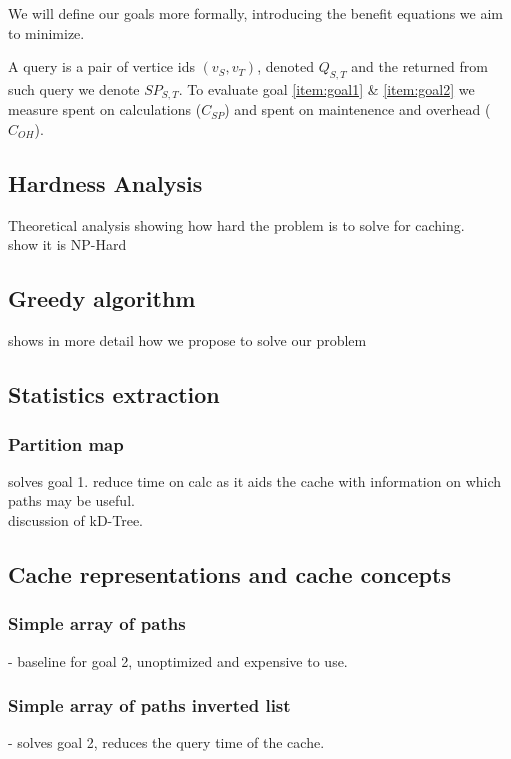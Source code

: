 We will define our goals more formally, introducing the benefit equations we aim to minimize.

A query is a pair of vertice ids $(v_S, v_T)$, denoted $Q_{S,T}$ and the \spath returned from such query we denote $SP_{S,T}$. 
To evaluate goal \ref{item:goal1} \& \ref{item:goal2} we measure \cet spent on \spath calculations ($C_{SP}$) and \cet spent on maintenence and overhead ($C_{OH}$).



\subsection{Hardness Analysis}
Theoretical analysis showing how hard the problem is to solve for \spath caching.\\
show it is NP-Hard
 

\subsection{Greedy algorithm}
shows in more detail how we propose to solve our problem


\subsection{Statistics extraction}

\subsubsection{Partition map} 
solves goal 1. reduce time on \spath calc as it aids the cache with information on which paths may be useful.\\ 
discussion of kD-Tree.


\subsection{Cache representations and cache concepts} 

\subsubsection{Simple array of paths} - baseline for goal 2, unoptimized and expensive to use.

\subsubsection{Simple array of paths inverted list} - solves goal 2, reduces the query time of the cache.

